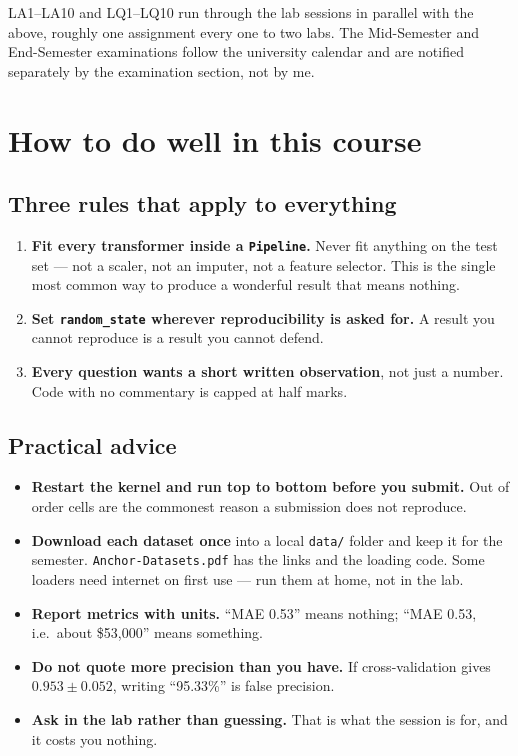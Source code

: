 \documentclass[11pt]{article}
\begin{document}
\noindent LA1--LA10 and LQ1--LQ10 run through the lab sessions in parallel with
the above, roughly one assignment every one to two labs. The Mid-Semester and
End-Semester examinations follow the university calendar and are notified
separately by the examination section, not by me.

\newpage
\section{How to do well in this course}

\subsection{Three rules that apply to everything}

\begin{enumerate}[leftmargin=*]
  \item \textbf{Fit every transformer inside a \texttt{Pipeline}.} Never fit
    anything on the test set --- not a scaler, not an imputer, not a feature
    selector. This is the single most common way to produce a wonderful result
    that means nothing.
  \item \textbf{Set \texttt{random\_state} wherever reproducibility is asked
    for.} A result you cannot reproduce is a result you cannot defend.
  \item \textbf{Every question wants a short written observation}, not just a
    number. Code with no commentary is capped at half marks.
\end{enumerate}

\subsection{Practical advice}

\begin{itemize}[leftmargin=*]
  \item \textbf{Restart the kernel and run top to bottom before you submit.} Out
    of order cells are the commonest reason a submission does not reproduce.
  \item \textbf{Download each dataset once} into a local \texttt{data/} folder
    and keep it for the semester. \texttt{Anchor-Datasets.pdf} has the links and
    the loading code. Some loaders need internet on first use --- run them at
    home, not in the lab.
  \item \textbf{Report metrics with units.} ``MAE 0.53'' means nothing;
    ``MAE 0.53, i.e.\ about \$53{,}000'' means something.
  \item \textbf{Do not quote more precision than you have.} If cross-validation
    gives $0.953 \pm 0.052$, writing ``95.33\%'' is false precision.
  \item \textbf{Ask in the lab rather than guessing.} That is what the session
    is for, and it costs you nothing.
\end{itemize}
\end{document}
